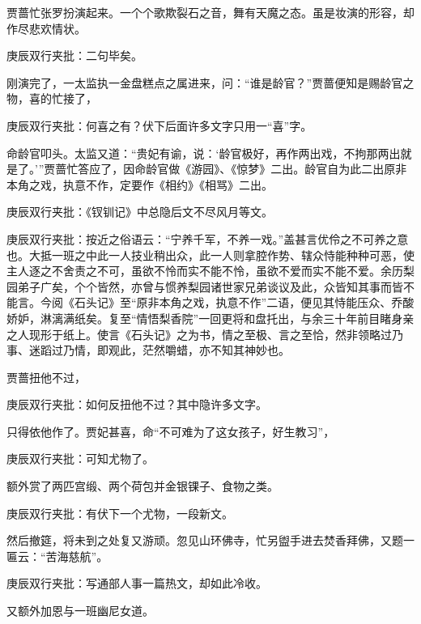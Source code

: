 \begin{parag}
    贾蔷忙张罗扮演起来。一个个歌欺裂石之音，舞有天魔之态。虽是妆演的形容，却作尽悲欢情状。\begin{note}庚辰双行夹批：二句毕矣。\end{note}刚演完了，一太监执一金盘糕点之属进来，问：“谁是龄官？”贾蔷便知是赐龄官之物，喜的忙接了，\begin{note}庚辰双行夹批：何喜之有？伏下后面许多文字只用一“喜”字。\end{note}命龄官叩头。太监又道：“贵妃有谕，说：‘龄官极好，再作两出戏，不拘那两出就是了。’”贾蔷忙答应了，因命龄官做《游园》、《惊梦》二出。龄官自为此二出原非本角之戏，执意不作，定要作《相约》《相骂》二出。\begin{note}庚辰双行夹批：《钗钏记》中总隐后文不尽风月等文。\end{note}\begin{note}庚辰双行夹批：按近之俗语云：“宁养千军，不养一戏。”盖甚言优伶之不可养之意也。大抵一班之中此一人技业稍出众，此一人则拿腔作势、辖众恃能种种可恶，使主人逐之不舍责之不可，虽欲不怜而实不能不怜，虽欲不爱而实不能不爱。余历梨园弟子广矣，个个皆然，亦曾与惯养梨园诸世家兄弟谈议及此，众皆知其事而皆不能言。今阅《石头记》至“原非本角之戏，执意不作”二语，便见其恃能压众、乔酸娇妒，淋漓满纸矣。复至“情悟梨香院”一回更将和盘托出，与余三十年前目睹身亲之人现形于纸上。使言《石头记》之为书，情之至极、言之至恰，然非领略过乃事、迷蹈过乃情，即观此，茫然嚼蜡，亦不知其神妙也。\end{note}贾蔷扭他不过，\begin{note}庚辰双行夹批：如何反扭他不过？其中隐许多文字。\end{note}只得依他作了。贾妃甚喜，命“不可难为了这女孩子，好生教习”，\begin{note}庚辰双行夹批：可知尤物了。\end{note}额外赏了两匹宫缎、两个荷包并金银锞子、食物之类。\begin{note}庚辰双行夹批：有伏下一个尤物，一段新文。\end{note}然后撤筵，将未到之处复又游顽。忽见山环佛寺，忙另盥手进去焚香拜佛，又题一匾云：“苦海慈航”。\begin{note}庚辰双行夹批：写通部人事一篇热文，却如此冷收。\end{note}又额外加恩与一班幽尼女道。
\end{parag}


